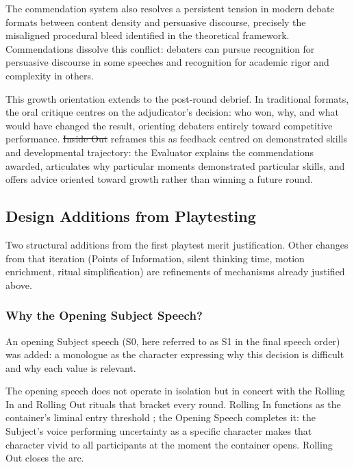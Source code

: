 \documentclass[12pt]{article}
\makeatletter
\providecommand{\DIFaddtex}[1]{{\protect\color[rgb]{0,0.5,0}\uwave{#1}}} %
\providecommand{\DIFdeltex}[1]{{\protect\color{red}\sout{#1}}} %
\providecommand{\DIFaddbegin}{} %
\providecommand{\DIFaddend}{} %
\providecommand{\DIFdelbegin}{} %
\providecommand{\DIFdelend}{} %
\providecommand{\DIFadd}[1]{\texorpdfstring{\DIFaddtex{#1}}{#1}} %
\providecommand{\DIFdel}[1]{\texorpdfstring{\DIFdeltex{#1}}{}} %
\providecommand{\DIFscaledelfig}{0.5}
\newlength{\DIFdelgraphicswidth} %
\newlength{\DIFdelgraphicsheight} %
\providecommand{\DIFaddincludegraphics}[2][]{{\color[rgb]{0,0.5,0}\fbox{\DIFOincludegraphics[#1]{#2}}}} %
\providecommand{\DIFdelincludegraphics}[2][]{%
\sbox{\DIFdelgraphicsbox}{\DIFOincludegraphics[#1]{#2}}%
\settoboxwidth{\DIFdelgraphicswidth}{\DIFdelgraphicsbox} %
\settoboxtotalheight{\DIFdelgraphicsheight}{\DIFdelgraphicsbox} %
\scalebox{\DIFscaledelfig}{%
\parbox[b]{\DIFdelgraphicswidth}{\usebox{\DIFdelgraphicsbox}\\[-\baselineskip] \rule{\DIFdelgraphicswidth}{0em}}\llap{\resizebox{\DIFdelgraphicswidth}{\DIFdelgraphicsheight}{%
\setlength{\unitlength}{\DIFdelgraphicswidth}%
\begin{picture}(1,1)%
\thicklines\linethickness{2pt} %
{\color[rgb]{1,0,0}\put(0,0){\framebox(1,1){}}}%
{\color[rgb]{1,0,0}\put(0,0){\line( 1,1){1}}}%
{\color[rgb]{1,0,0}\put(0,1){\line(1,-1){1}}}%
\end{picture}%
}\hspace*{3pt}}} %
} %
\DeclareRobustCommand{\DIFaddbegin}{\DIFOaddbegin \let\includegraphics\DIFaddincludegraphics} %
\DeclareRobustCommand{\DIFaddend}{\DIFOaddend \let\includegraphics\DIFOincludegraphics} %
\DeclareRobustCommand{\DIFdelbegin}{\DIFOdelbegin \let\includegraphics\DIFdelincludegraphics} %
\DeclareRobustCommand{\DIFdelend}{\DIFOaddend \let\includegraphics\DIFOincludegraphics} %
\let\sout@orig\sout %
\renewcommand{\sout}[1]{\ifmmode\text{\sout@orig{\ensuremath{#1}}}\else\sout@orig{#1}\fi} %
\makeatother
\begin{document}
The commendation system also resolves a persistent tension in modern debate formats between content density and persuasive discourse, precisely the misaligned procedural bleed identified in the theoretical framework. Commendations dissolve this conflict: debaters can pursue recognition for persuasive discourse in some speeches and recognition for academic rigor and complexity in others.

This growth orientation extends to the post-round debrief. In traditional formats, the oral critique centres on the adjudicator's decision: who won, why, and what would have changed the result, orienting debaters entirely toward competitive performance. \DIFdelbegin \DIFdel{Inside Out }\DIFdelend \DIFaddbegin \emph{\DIFadd{Inside Out}} \DIFaddend reframes this as feedback centred on demonstrated skills and developmental trajectory: the Evaluator explains the commendations awarded, articulates why particular moments demonstrated particular skills, and offers advice oriented toward growth rather than winning a future round.

\subsection{Design Additions from Playtesting}

Two structural additions from the first playtest merit justification. Other changes from that iteration (Points of Information, silent thinking time, motion enrichment, ritual simplification) are refinements of mechanisms already justified above.

\subsubsection{Why the Opening Subject Speech?}

An opening Subject speech (S0, here referred to as S1 in the final speech order) was added: a monologue as the character expressing why this decision is difficult and why each value is relevant.

The opening speech does not operate in isolation but in concert with the Rolling In and Rolling Out rituals that bracket every round. Rolling In functions as the container's liminal entry threshold \parencite{bowman2025transformative}; the Opening Speech completes it: the Subject's voice performing uncertainty as a specific character makes that character vivid to all participants at the moment the container opens. Rolling Out closes the arc.
\end{document}
